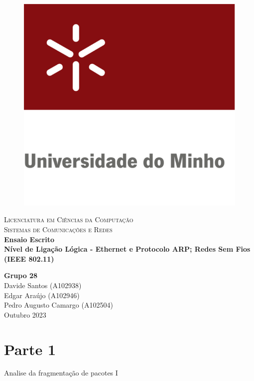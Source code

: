 \documentclass{article}
\begin{document}
\begin{titlepage}

\center %

\newcommand{\HRule}{\rule{\linewidth}{0.4mm}} %

\begin{figure}[h]
    \centering
    \includegraphics[width=0.24\linewidth]{images/uniMinho.jpg}
\end{figure}

\textsc{\Large Licenciatura em Ciências da Computação}\\[0.4cm] %
\textsc{\Large Sistemas de Comunicações e Redes}\\[5cm]

{\Large\bfseries Ensaio Escrito}\\[0.5cm]
{\LARGE \bfseries   Nível de Ligação Lógica - Ethernet e Protocolo ARP; Redes Sem Fios (IEEE 802.11)} %


\vspace{5cm} %
{\bfseries Grupo 28} \\ \vspace{3mm}
Davide Santos (A102938) \\ \vspace{3mm}
Edgar Araújo (A102946) \\ \vspace{3mm}
Pedro Augusto Camargo (A102504) \\ \vspace{3mm}
\vspace{0.2cm}
{Outubro 2023}\\[0.2cm] %

\vfill %
\end{titlepage}

\tableofcontents
\pagebreak

\section{Parte 1}
\begin{description}
    \item[Analise da fragmentação de pacotes I] 
\end{description}
\end{document}
